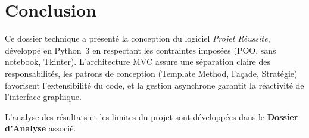 \documentclass[12pt, a4paper, french]{report}
\begin{document}
\chapter*{Conclusion}

Ce dossier technique a présenté la conception du logiciel \textit{Projet Réussite}, développé en Python~3 en respectant les contraintes imposées (POO, sans notebook, Tkinter). L'architecture MVC assure une séparation claire des responsabilités, les patrons de conception (Template Method, Façade, Stratégie) favorisent l'extensibilité du code, et la gestion asynchrone garantit la réactivité de l'interface graphique.

L'analyse des résultats et les limites du projet sont développées dans le \textbf{Dossier d'Analyse} associé.
\end{document}
